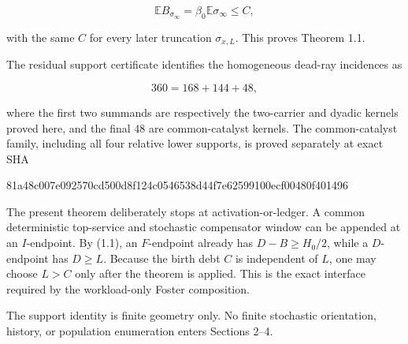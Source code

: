 \[
                  \mathbb E B_{\sigma_\infty}
                        =\beta_0\mathbb E\sigma_\infty\le C,          \tag{5.1}
\]

with the same \(C\) for every later truncation \(\sigma_{x,L}\). This
proves Theorem 1.1.

The residual support certificate identifies the homogeneous dead-ray
incidences as

\[
                         360=168+144+48,              \tag{5.2}
\]

where the first two summands are respectively the two-carrier and dyadic
kernels proved here, and the final 48 are common-catalyst kernels. The
common-catalyst family, including all four relative lower supports, is
proved separately at exact SHA

\begin{CodeBlock}
81a48c007e092570cd500d8f124c0546538d44f7e62599100ecf00480f401496
\end{CodeBlock}

The present theorem deliberately stops at activation-or-ledger. A common
deterministic top-service and stochastic compensator window can be
appended at an \(I\)-endpoint. By (1.1), an \(F\)-endpoint already has
\(D-B\ge H_0/2\), while a \(D\)-endpoint has \(D\ge L\). Because the
birth debt \(C\) is independent of \(L\), one may choose \(L>C\) only
after the theorem is applied. This is the exact interface required by
the workload-only Foster composition.

The support identity is finite geometry only. No finite stochastic
orientation, history, or population enumeration enters Sections 2--4.
